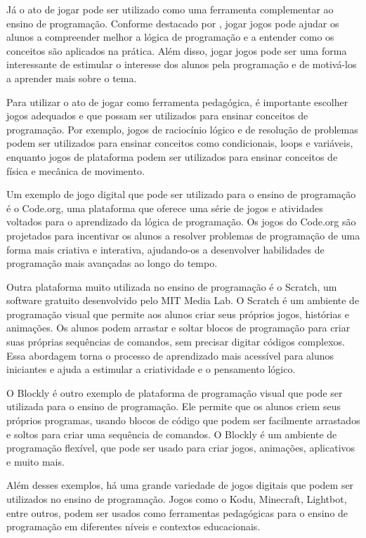 Já o ato de jogar pode ser utilizado como uma ferramenta complementar ao ensino de programação. Conforme destacado por \cite{Pereira2016}, jogar jogos pode ajudar os alunos a compreender melhor a lógica de programação e a entender como os conceitos são aplicados na prática. Além disso, jogar jogos pode ser uma forma interessante de estimular o interesse dos alunos pela programação e de motivá-los a aprender mais sobre o tema.

Para utilizar o ato de jogar como ferramenta pedagógica, é importante escolher jogos adequados e que possam ser utilizados para ensinar conceitos de programação. Por exemplo, jogos de raciocínio lógico e de resolução de problemas podem ser utilizados para ensinar conceitos como condicionais, loops e variáveis, enquanto jogos de plataforma podem ser utilizados para ensinar conceitos de física e mecânica de movimento.

Um exemplo de jogo digital que pode ser utilizado para o ensino de programação é o Code.org, uma plataforma que oferece uma série de jogos e atividades voltados para o aprendizado da lógica de programação. Os jogos do Code.org são projetados para incentivar os alunos a resolver problemas de programação de uma forma mais criativa e interativa, ajudando-os a desenvolver habilidades de programação mais avançadas ao longo do tempo.

Outra plataforma muito utilizada no ensino de programação é o Scratch, um software gratuito desenvolvido pelo MIT Media Lab. O Scratch é um ambiente de programação visual que permite aos alunos criar seus próprios jogos, histórias e animações. Os alunos podem arrastar e soltar blocos de programação para criar suas próprias sequências de comandos, sem precisar digitar códigos complexos. Essa abordagem torna o processo de aprendizado mais acessível para alunos iniciantes e ajuda a estimular a criatividade e o pensamento lógico.

O Blockly é outro exemplo de plataforma de programação visual que pode ser utilizada para o ensino de programação. Ele permite que os alunos criem seus próprios programas, usando blocos de código que podem ser facilmente arrastados e soltos para criar uma sequência de comandos. O Blockly é um ambiente de programação flexível, que pode ser usado para criar jogos, animações, aplicativos e muito mais.


Além desses exemplos, há uma grande variedade de jogos digitais que podem ser utilizados no ensino de programação. Jogos como o Kodu, Minecraft, Lightbot, entre outros, podem ser usados como ferramentas pedagógicas para o ensino de programação em diferentes níveis e contextos educacionais.

